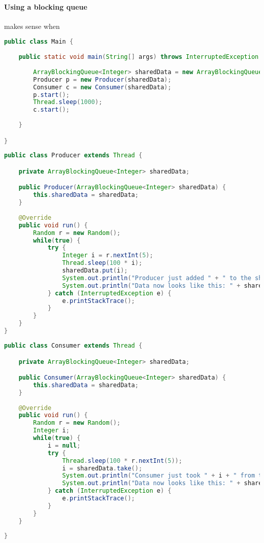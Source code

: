\paragraph{Using a blocking queue} makes sense when 
\begin{lstlisting}[language=java]
public class Main {
	
	public static void main(String[] args) throws InterruptedException {
		
		ArrayBlockingQueue<Integer> sharedData = new ArrayBlockingQueue<Integer>(100);
		Producer p = new Producer(sharedData);
		Consumer c = new Consumer(sharedData);
		p.start();
		Thread.sleep(1000);
		c.start();
		
	}

}
\end{lstlisting}
\begin{lstlisting}[language=java]
public class Producer extends Thread {

	private ArrayBlockingQueue<Integer> sharedData;

	public Producer(ArrayBlockingQueue<Integer> sharedData) {
		this.sharedData = sharedData;
	}
	
	@Override
	public void run() {
		Random r = new Random();
		while(true) {
			try {
				Integer i = r.nextInt(5);
				Thread.sleep(100 * i);
				sharedData.put(i);
				System.out.println("Producer just added " + " to the shared data.");
				System.out.println("Data now looks like this: " + sharedData.toString());
			} catch (InterruptedException e) {
				e.printStackTrace();
			}
		}
	}
}
\end{lstlisting}
\begin{lstlisting}[language=java]
public class Consumer extends Thread {

	private ArrayBlockingQueue<Integer> sharedData;

	public Consumer(ArrayBlockingQueue<Integer> sharedData) {
		this.sharedData = sharedData;
	}
	
	@Override
	public void run() {
		Random r = new Random();
		Integer i;
		while(true) {
			i = null;
			try {
				Thread.sleep(100 * r.nextInt(5));
				i = sharedData.take();
				System.out.println("Consumer just took " + i + " from the shared data.");
				System.out.println("Data now looks like this: " + sharedData.toString());
			} catch (InterruptedException e) {
				e.printStackTrace();
			}
		}
	}
	
}
\end{lstlisting}


